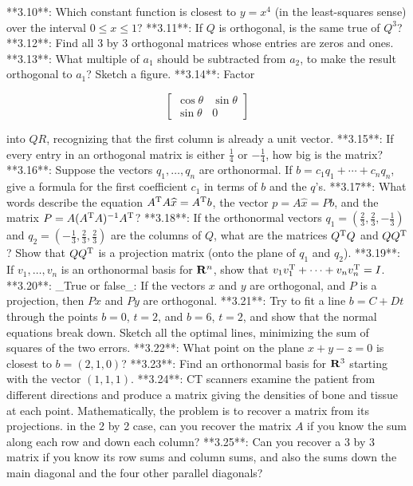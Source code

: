 

**3.10**: Which constant function is closest to \(y=x^{4}\) (in the least-squares sense) over the interval \(0\leq x\leq 1\)?
**3.11**: If \(Q\) is orthogonal, is the same true of \(Q^{3}\)?
**3.12**: Find all 3 by 3 orthogonal matrices whose entries are zeros and ones.
**3.13**: What multiple of \(a_{1}\) should be subtracted from \(a_{2}\), to make the result orthogonal to \(a_{1}\)? Sketch a figure.
**3.14**: Factor

\[\begin{bmatrix}\cos\theta&\sin\theta\\ \sin\theta&0\end{bmatrix}\]

into \(QR\), recognizing that the first column is already a unit vector.
**3.15**: If every entry in an orthogonal matrix is either \(\frac{1}{4}\) or \(-\frac{1}{4}\), how big is the matrix?
**3.16**: Suppose the vectors \(q_{1},\ldots,q_{n}\) are orthonormal. If \(b=c_{1}q_{1}+\cdots+c_{n}q_{n}\), give a formula for the first coefficient \(c_{1}\) in terms of \(b\) and the \(q\)'s.
**3.17**: What words describe the equation \(A^{\rm T}A\widehat{x}=A^{\rm T}b\), the vector \(p=A\widehat{x}=Pb\), and the matrix \(P=A(A^{\rm T}A)^{-1}A^{\rm T}\)?
**3.18**: If the orthonormal vectors \(q_{1}=(\frac{2}{3},\frac{2}{3},-\frac{1}{3})\) and \(q_{2}=(-\frac{1}{3},\frac{2}{3},\frac{2}{3})\) are the columns of \(Q\), what are the matrices \(Q^{\rm T}Q\) and \(QQ^{\rm T}\)? Show that \(QQ^{\rm T}\) is a projection matrix (onto the plane of \(q_{1}\) and \(q_{2}\)).
**3.19**: If \(v_{1},\ldots,v_{n}\) is an orthonormal basis for \({\bf R}^{n}\), show that \(v_{1}v_{1}^{\rm T}+\cdots+v_{n}v_{n}^{\rm T}=I\).
**3.20**: _True or false_: If the vectors \(x\) and \(y\) are orthogonal, and \(P\) is a projection, then \(Px\) and \(Py\) are orthogonal.
**3.21**: Try to fit a line \(b=C+Dt\) through the points \(b=0\), \(t=2\), and \(b=6\), \(t=2\), and show that the normal equations break down. Sketch all the optimal lines, minimizing the sum of squares of the two errors.
**3.22**: What point on the plane \(x+y-z=0\) is closest to \(b=(2,1,0)\)?
**3.23**: Find an orthonormal basis for \({\bf R}^{3}\) starting with the vector \((1,1,1)\).
**3.24**: CT scanners examine the patient from different directions and produce a matrix giving the densities of bone and tissue at each point. Mathematically, the problem is to recover a matrix from its projections. in the 2 by 2 case, can you recover the matrix \(A\) if you know the sum along each row and down each column?
**3.25**: Can you recover a 3 by 3 matrix if you know its row sums and column sums, and also the sums down the main diagonal and the four other parallel diagonals?